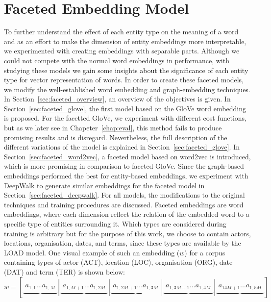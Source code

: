 
\chapter{Faceted Embedding Model}\label{chap:faceted}
To further understand the effect of each entity type on the meaning of a word and as an effort to make the dimension of entity embeddings more interpretable, we experimented with creating embeddings with separable parts. Although we could not compete with the normal word embeddings in performance, with studying these models we gain some insights about the significance of each entity type for vector representation of words. In order to create these faceted models, we modify the well-established word embedding and graph-embedding techniques. In Section~\ref{sec:faceted_overview}, an overview of the objectives is given. In Section~\ref{sec:faceted_glove}, the first model based on the GloVe word embedding is proposed. For the facetted GloVe, we experiment with different cost functions, but as we later see in Chapeter~\ref{chap:eval}, this method fails to produce promising results and is disregard. Nevertheless, the full description of the different variations of the model is explained in Section~\ref{sec:faceted_glove}. In Section~\ref{sec:faceted_word2vec}, a faceted model based on word2vec is introduced, which is more promising in comparison to faceted GloVe. Since the graph-based embeddings performed the best for entity-based embeddings, we experiment with DeepWalk to generate similar embeddings for the faceted model in Section~\ref{sec:faceted_deepwalk}. For all models, the modifications to the original techniques and training procedures are discussed. 
\ornament
Faceted embeddings are word embeddings, where each dimension reflect the relation of the embedded word to a specific type of entities surrounding it. Which types are considered during training is arbitrary but for the purpose of this work, we choose to contain actors, locations, organisation, dates, and terms, since these types are available by the LOAD model. One visual example of such an embedding ($w$) for a corpus containing types of actor (ACT), location (LOC), organisation (ORG), date (DAT) and term (TER) is shown below: \\
\mathleft
\begin{equation}
w=\left[ \underbrace { \begin{matrix}{ a }_{ 1,1 } ... { a }_{ 1,M } \end{matrix} } |\underbrace { \begin{matrix}{ a }_{ 1,M+1 } ... { a }_{ 1,2M } \end{matrix} } |\underbrace { \begin{matrix}{ a }_{ 1,2M+1 } ... { a }_{ 1,3M } \end{matrix} } |\underbrace { \begin{matrix}{ a }_{ 1,3M+1 } ... { a }_{ 1,4M } \end{matrix} } |\underbrace { \begin{matrix}{ a }_{ 14M+1 } ... { a }_{ 1,5M } \end{matrix} }  \right] 
\label{eq:concat_vec}
\end{equation}
